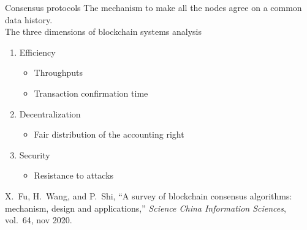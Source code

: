 \documentclass{beamer}
\begin{document}
\begin{frame}{Consensus protocols}
The mechanism to make all the nodes agree on a common data history.\\
\vspace{0.3cm}
The three dimensions of blockchain systems analysis
\begin{enumerate}
  \item Efficiency 
  \begin{itemize}
    \item Throughputs
    \item Transaction confirmation time
  \end{itemize}
  \item Decentralization 
  \begin{itemize}
    \item Fair distribution of the accounting right
  \end{itemize}
  \item Security 
  \begin{itemize}
    \item Resistance to attacks
  \end{itemize}
\end{enumerate}
\footnotesize
\begin{thebibliography}{1}
X.~Fu, H.~Wang, and P.~Shi, ``A survey of blockchain consensus algorithms:
  mechanism, design and applications,'' {\em Science China Information
  Sciences}, vol.~64, nov 2020.
\end{thebibliography}
\end{frame}
\end{document}
